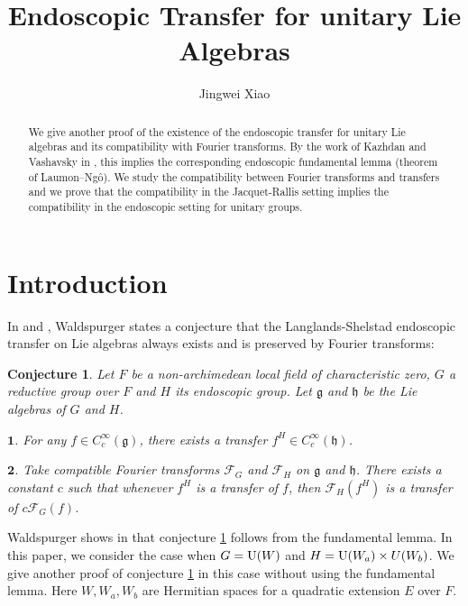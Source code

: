\documentclass[11pt, oneside,reqno]{amsart}   	%
\title{Endoscopic Transfer for unitary Lie Algebras}
\author{Jingwei Xiao}
\newtheorem{conjecture}[theorem]{Conjecture}
\begin{document}

\maketitle

\begin{abstract}
We give another proof of the existence of the endoscopic transfer for unitary Lie algebras and its compatibility with Fourier transforms. By the work of Kazhdan and Vashavsky in \cite{Kazhdan}, this implies the corresponding endoscopic fundamental lemma (theorem of Laumon--Ng\^o).  We study the compatibility between Fourier transforms and transfers and we prove that the compatibility in the Jacquet-Rallis setting implies the compatibility in the endoscopic setting for unitary groups.
\end{abstract}

\tableofcontents



\section{Introduction}

In \cite{Wa1} and \cite{Wa2}, Waldspurger states a conjecture that the Langlands-Shelstad endoscopic transfer on Lie algebras always exists and is preserved by Fourier transforms:

\begin{conjecture} \label{MC}
Let $F$ be a non-archimedean local field of characteristic zero, $G$ a reductive group over $F$ and $H$ its endoscopic group. Let $\mathfrak{g}$ and $\mathfrak{h}$ be the Lie algebras of $G$ and $H$.

$\mathbf{1}$. For any $f \in C_c^\infty(\mathfrak{g})$, there exists a transfer $f^H \in C_c^\infty(\mathfrak{h})$.

$\mathbf{2}$. Take compatible Fourier transforms $\mathcal{F}_G$ and $\mathcal{F}_H$ on  $\mathfrak{g}$ and $\mathfrak{h}$. There exists a constant $c$ such that whenever $f^H$ is a transfer of $f $, then
$\mathcal{F}_H(f^H)$ is a transfer of $c\mathcal{F}_G(f)$. 

\end{conjecture}

Waldspurger shows in \cite{Wa2} that conjecture \ref{MC} follows from the fundamental lemma. In this paper, we consider the case when $G=\textup{U}(W)$ and $H=\textup{U}(W_a) \times U(W_b)$. We give another proof of conjecture \ref{MC} in this case without using the fundamental lemma. Here $W, W_a, W_b$ are Hermitian spaces for a quadratic extension $E$ over $F$. 
\end{document}
